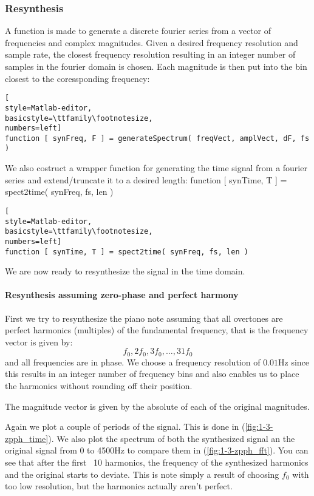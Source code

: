 \subsubsection{ Resynthesis }
A function is made to generate a discrete fourier series from a vector of
frequencies and complex magnitudes. Given a desired frequency resolution and
sample rate, the closest frequency resolution resulting in an integer number of
samples in the fourier domain is chosen. Each magnitude is then put into the bin
closest to the coressponding frequency:
\begin{lstlisting}[
style=Matlab-editor,
basicstyle=\ttfamily\footnotesize,
numbers=left]
function [ synFreq, F ] = generateSpectrum( freqVect, amplVect, dF, fs )
\end{lstlisting}

We also costruct a wrapper function for generating the time signal from a
fourier series and extend/truncate it to a desired length:
function [ synTime, T ] = spect2time( synFreq, fs, len )
\begin{lstlisting}[
style=Matlab-editor,
basicstyle=\ttfamily\footnotesize,
numbers=left]
function [ synTime, T ] = spect2time( synFreq, fs, len )
\end{lstlisting}

We are now ready to resynthesize the signal in the time domain.
\paragraph{ Resynthesis assuming zero-phase and perfect harmony }
First we try to resynthesize the piano note assuming that all overtones are
perfect harmonics (multiples) of the fundamental frequency, that is the
frequency vector is given by:
\begin{equation*}
 f_0, 2 f_0, 3 f_0, \ldots , 31 f_0
\end{equation*}
and all frequencies are in phase.
We choose a frequency resolution of $0.01\mbox{Hz}$ since this results in an
integer number of frequency bins and also enables us to place the harmonics
without rounding off their position.

The magnitude vector is given by the absolute of each of the original
magnitudes.

Again we plot a couple of periods of the signal. This is done in
(\ref{fig:1-3-zpph_time}). We also plot the spectrum of both the synthesized
signal an the original signal from 0 to 4500Hz to compare them in
(\ref{fig:1-3-zpph_fft}). You can see that after the first ~10 harmonics, the
frequency of the synthesized harmonics and the original starts to deviate. This
is note simply a result of choosing $f_0$ with too low resolution, but the
harmonics actually aren't perfect.

